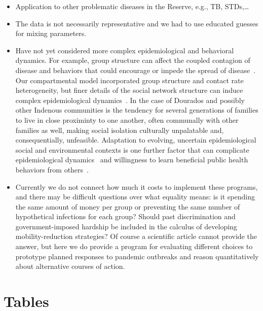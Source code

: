 \documentclass[
  letterpaper,
  abstract]{scrartcl}
\begin{document}
\begin{itemize}
  \item 
    Application to other problematic diseases in the Reserve, e.g., TB, STDs,\ldots 
  \item
    The data is not necessarily representative and we had to use educated guesses
    for mixing parameters.
  \item
    Have not yet considered more complex epidemiological and behavioral
    dynamics. For example, group structure can affect the coupled contagion of
    disease and behaviors that could encourage or impede the spread of
    disease~\autocite{SmaldinoJones2021}. Our compartmental model
    incorporated group structure and contact rate heterogeneity, but finer
    details of the social network structure can induce complex
    epidemiological dynamics~\autocite{Arthur2017}. In the case of Dourados
    and possibly other Indenous communities is the tendency for several
    generations of families to live in close proximinty to one another,
    often communally with other families as well, making social isolation
    culturally unpalatable and, consequentially, unfeasible. Adaptation to
    evolving, uncertain epidemiological social and environmental contexts is
    one further factor that can complicate epidemiological
    dynamics~\autocite{Arthur2021} and willingness to learn beneficial public
    health behaviors from others~\autocite{Turner2023a}.
  \item
    Currently we do not connect how much it costs to implement these programs,
    and there may be difficult questions over what equality means: is it
    spending the same amount of money per group or preventing the same number of
    hypothetical infections for each group? Should past discrimination and
    government-imposed hardship be included in the calculus of developing
    mobility-reduction strategies? Of course a scientific article 
    cannot provide the answer, but here we do provide a program for evaluating
    different choices to prototype planned responses to pandemic outbreaks and
    reason quantitatively about alternative courses of action.
\end{itemize}


\printbibliography[title=References]


\clearpage

\section{Tables}
\end{document}
